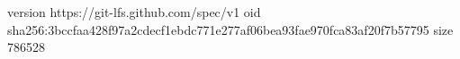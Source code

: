 version https://git-lfs.github.com/spec/v1
oid sha256:3bccfaa428f97a2cdecf1ebdc771e277af06bea93fae970fca83af20f7b57795
size 786528

